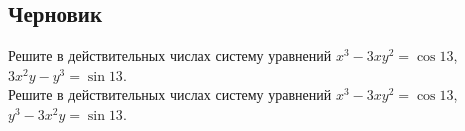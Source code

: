 %
%

\subsection*{Черновик}

\begin{problems}

\item
\sbp
Решите в действительных числах систему уравнений
$x^3 - 3 x y^2 = \cos 13$, $3 x^2 y - y^3 = \sin 13$.
\\
\sbp
Решите в действительных числах систему уравнений
$x^3 - 3 x y^2 = \cos 13$, $y^3 - 3 x^2 y = \sin 13$.

\end{problems}

